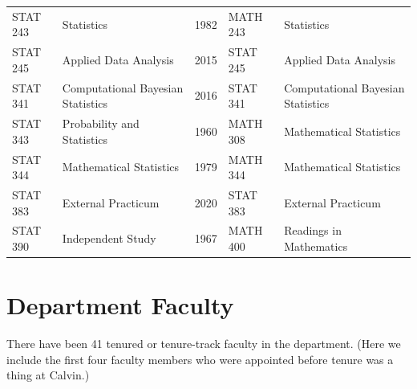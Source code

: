 \documentclass[
]{book}
\begin{document}
\begin{table}
\begin{tabular}[t]{llrll}
STAT 243 & Statistics & 1982 & MATH 243 & Statistics\\
STAT 245 & Applied Data Analysis & 2015 & STAT 245 & Applied Data Analysis\\
STAT 341 & Computational Bayesian Statistics & 2016 & STAT 341 & Computational Bayesian Statistics\\
\addlinespace
STAT 343 & Probability and Statistics & 1960 & MATH 308 & Mathematical Statistics\\
STAT 344 & Mathematical Statistics & 1979 & MATH 344 & Mathematical Statistics\\
STAT 383 & External Practicum & 2020 & STAT 383 & External Practicum\\
STAT 390 & Independent Study & 1967 & MATH 400 & Readings in Mathematics\\
\bottomrule
\end{tabular}
\end{table}

\hypertarget{department-faculty}{%
\chapter{Department Faculty}\label{department-faculty}}

There have been 41 tenured or tenure-track faculty in the department. (Here we include the first four faculty members who were appointed before tenure was a thing at Calvin.)
\end{document}
